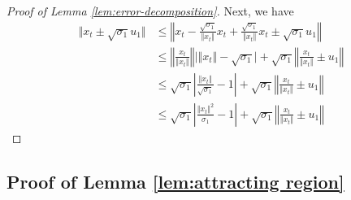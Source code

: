\begin{proof}[Proof of Lemma \ref{lem:error-decomposition}]
\medskip     
Next, we have 
    \begin{align*}
        \Vert x_t \pm \sqrt{\sigma_1} u_1 \Vert & \le \left\Vert x_t - \frac{\sqrt{\sigma_1}}{\Vert x_t \Vert} x_t + \frac{\sqrt{\sigma_1}}{\Vert x_t \Vert} x_t   \pm  \sqrt{\sigma_1} u_1 \right \Vert   \\
        & \le \left\Vert \frac{  x_t}{\Vert x_t \Vert }\right\Vert \vert \Vert x_t \Vert - \sqrt{\sigma_1} \vert + \sqrt{\sigma_1} \left\Vert \frac{x_t }{\Vert x_t \Vert} \pm u_1\right\Vert \\
        & \le \sqrt{\sigma_1} \left\vert \frac{\Vert x_t \Vert}{\sqrt{\sigma_1}} - 1 \right\vert + \sqrt{\sigma_1} \left\Vert \frac{x_t }{\Vert x_t \Vert} \pm u_1\right\Vert  \\
        & \le \sqrt{\sigma_1} \left\vert \frac{\Vert x_t \Vert^2}{\sigma_1} - 1 \right\vert + \sqrt{\sigma_1} \left\Vert \frac{x_t }{\Vert x_t \Vert} \pm u_1\right\Vert 
    \end{align*}
\end{proof}






\subsection{Proof of Lemma \ref{lem:attracting region}}\label{sec:proof attracting region}

